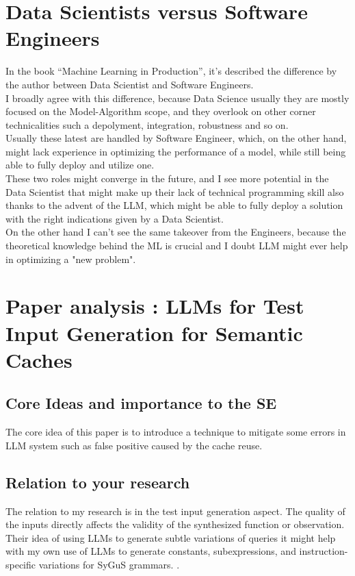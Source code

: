 \documentclass[12pt]{article}
\begin{document}
\section{Data Scientists versus Software Engineers}
In the book “Machine Learning in Production”, it's described the difference by the author between Data Scientist and Software Engineers. \\
I broadly agree with this difference, because Data Science usually they are mostly focused on the Model-Algorithm scope, and they overlook on other corner technicalities such a depolyment, integration, robustness and so on.\\
Usually these latest are handled by Software Engineer, which, on the other hand, might lack experience in optimizing the performance of a model, while still being able to fully deploy and utilize one.\\
These two roles might converge in the future, and I see more potential in the Data Scientist that might make up their lack of technical programming skill also thanks to the advent of the LLM, which might be able to fully deploy a solution with the right indications given by a Data Scientist. \\
On the other hand I can't see the same takeover from the Engineers, because the theoretical knowledge behind the ML is crucial and I doubt LLM might ever help in optimizing a "new problem". \\

\section{Paper analysis : LLMs for Test Input Generation for Semantic Caches}

\subsection{Core Ideas and importance to the SE}
The core idea of this paper is to introduce a technique to mitigate some errors in LLM system such as false positive caused by the cache reuse.

\subsection{Relation to your research}
The relation to my research is in the test input generation aspect. The quality of the inputs directly affects the validity of the synthesized function or observation. Their idea of using LLMs to generate subtle variations of queries it might help with my own use of LLMs to generate constants, subexpressions, and instruction-specific variations for SyGuS grammars. . \\
\end{document}

